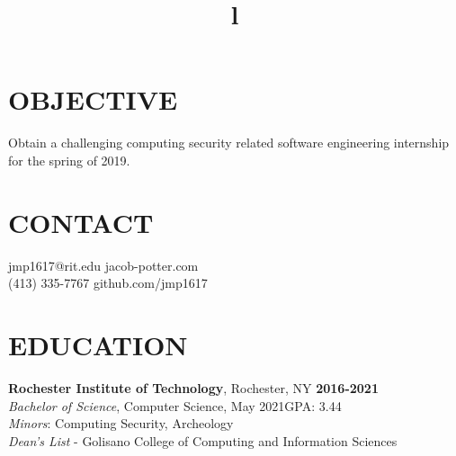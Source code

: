 \documentclass[line,margin]{res}
\begin{document}
\begin{resume}

\section{OBJECTIVE}
Obtain a challenging computing security related software engineering internship for the spring of 2019.

\section{CONTACT}
{jmp1617@rit.edu}\hfill 
{jacob-potter.com}\\
(413) 335-7767\hfill 
{github.com/jmp1617}

\section{EDUCATION}
\textbf{Rochester Institute of Technology}, Rochester, NY\hfill
    \textbf{2016-2021}\\
{\sl Bachelor of Science}, Computer Science, May 2021\hfill GPA: 3.44
\\
{\sl Minors}: Computing Security, Archeology
\\
{\sl Dean's List} - Golisano College of Computing and Information Sciences

\begin{format}
\title{l}\\
\\
\body\\
\end{format}

\end{resume}
\end{document}
